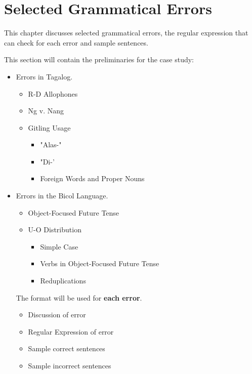\chapter{Selected Grammatical Errors}
This chapter discusses selected grammatical errors, the regular expression that can check for each error and sample sentences.

{\color{blue}
This section will contain the preliminaries for the case study:

\begin{itemize}
    \item Errors in Tagalog.
    \begin{itemize}
        \item R-D Allophones
        \item Ng v. Nang
        \item Gitling Usage
        \begin{itemize}
            \item "Alas-"
            \item "Di-'
            \item Foreign Words and Proper Nouns
        \end{itemize}
    \end{itemize}
    \item Errors in the Bicol Language.
    \begin{itemize}
        \item Object-Focused Future Tense
        \item U-O Distribution
        \begin{itemize}
            \item Simple Case
            \item Verbs in Object-Focused Future Tense
            \item Reduplications
        \end{itemize}
    \end{itemize}

    The format will be used for \textbf{each error}.
    \begin{itemize}
        \item Discussion of error
        \item Regular Expression of error
        \item Sample correct sentences
        \item Sample incorrect sentences
    \end{itemize}
\end{itemize}
}

